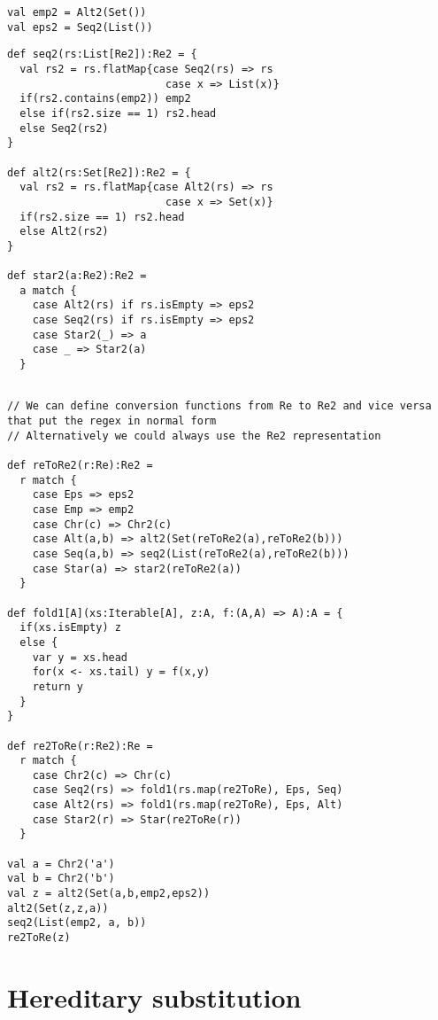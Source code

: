 \documentclass[a4paper, 11pt]{article}
\theoremstyle{definition}
\begin{document}
\begin{lstlisting}
val emp2 = Alt2(Set())
val eps2 = Seq2(List())
\end{lstlisting}

\begin{lstlisting}
def seq2(rs:List[Re2]):Re2 = {
  val rs2 = rs.flatMap{case Seq2(rs) => rs
                         case x => List(x)}
  if(rs2.contains(emp2)) emp2
  else if(rs2.size == 1) rs2.head
  else Seq2(rs2)
}

def alt2(rs:Set[Re2]):Re2 = {
  val rs2 = rs.flatMap{case Alt2(rs) => rs
                         case x => Set(x)}
  if(rs2.size == 1) rs2.head
  else Alt2(rs2)
}

def star2(a:Re2):Re2 =
  a match {
    case Alt2(rs) if rs.isEmpty => eps2
    case Seq2(rs) if rs.isEmpty => eps2
    case Star2(_) => a
    case _ => Star2(a)
  }
\end{lstlisting}

\begin{lstlisting}

// We can define conversion functions from Re to Re2 and vice versa that put the regex in normal form
// Alternatively we could always use the Re2 representation

def reToRe2(r:Re):Re2 =
  r match {
    case Eps => eps2
    case Emp => emp2
    case Chr(c) => Chr2(c)
    case Alt(a,b) => alt2(Set(reToRe2(a),reToRe2(b)))
    case Seq(a,b) => seq2(List(reToRe2(a),reToRe2(b)))
    case Star(a) => star2(reToRe2(a))
  }

def fold1[A](xs:Iterable[A], z:A, f:(A,A) => A):A = {
  if(xs.isEmpty) z
  else {
    var y = xs.head
    for(x <- xs.tail) y = f(x,y)
    return y
  }
}

def re2ToRe(r:Re2):Re =
  r match {
    case Chr2(c) => Chr(c)
    case Seq2(rs) => fold1(rs.map(re2ToRe), Eps, Seq)
    case Alt2(rs) => fold1(rs.map(re2ToRe), Eps, Alt)
    case Star2(r) => Star(re2ToRe(r))
  }

val a = Chr2('a')
val b = Chr2('b')
val z = alt2(Set(a,b,emp2,eps2))
alt2(Set(z,z,a))
seq2(List(emp2, a, b))
re2ToRe(z)

\end{lstlisting}


\section{Hereditary substitution}

\cite{keller:inria-00520606}

\newcommand{\ap}{\mathsf{app}}
\end{document}
